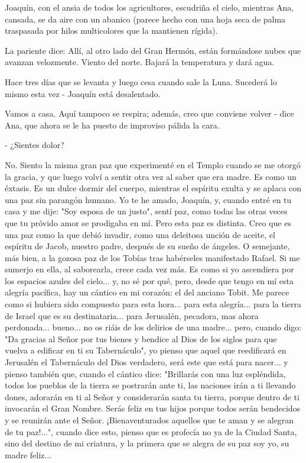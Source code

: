 \documentclass[12pt]{book} %
\begin{document}
Joaquín, con el ansia de todos los agricultores, escudriña el cielo, mientras Ana, cansada, se da aire con un abanico (parece hecho con una hoja seca de palma traspasada por hilos multicolores que la mantienen rígida). 

La pariente dice: Allí, al otro lado del Gran Hermón, están formándose nubes que avanzan velozmente. Viento del norte. Bajará la temperatura y dará agua. 

Hace tres días que se levanta y luego cesa cuando sale la Luna. Sucederá lo mismo esta vez - Joaquín está desalentado. 

Vamos a casa. Aquí tampoco se respira; además, creo que conviene volver - dice Ana, que ahora se le ha puesto de improviso pálida la cara. 

- ¿Sientes dolor? 

No. Siento la misma gran paz que experimenté en el Templo cuando se me otorgó la gracia, y que luego volví a sentir otra vez al saber que era madre. Es como un éxtasis. Es un dulce dormir del cuerpo, mientras el espíritu exulta y se aplaca con una paz sin parangón humano. Yo te he amado, Joaquín, y, cuando entré en tu casa y me dije: "Soy esposa de un justo", sentí paz, como todas las otras veces que tu próvido amor se prodigaba en mí. Pero esta paz es distinta. Creo que es una paz como la que debió invadir, como una deleitosa unción de aceite, el espíritu de Jacob, nuestro padre, después de su sueño de ángeles. O semejante, más bien, a la gozosa paz de los Tobías tras habérseles manifestado Rafael. Si me sumerjo en ella, al saborearla, crece cada vez más. Es como si yo ascendiera por los espacios azules del cielo... y, no sé por qué, pero, desde que tengo en mí esta alegría pacífica, hay un cántico en mi corazón: el del anciano Tobit. Me parece como si hubiera sido compuesto para esta hora... para esta alegría... para la tierra de Israel que es su destinataria... para Jerusalén, pecadora, mas ahora perdonada... bueno... no os riáis de los delirios de una madre... pero, cuando digo: "Da gracias al Señor por tus bienes y bendice al Dios de los siglos para que vuelva a edificar en ti su Tabernáculo", yo pienso que aquel que reedificará en Jerusalén el Tabernáculo del Dios verdadero, será este que está para nacer... y pienso también que, cuando el cántico dice: "Brillarás con una luz espléndida, todos los pueblos de la tierra se postrarán ante ti, las naciones irán a ti llevando dones, adorarán en ti al Señor y considerarán santa tu tierra, porque dentro de ti invocarán el Gran Nombre. Serás feliz en tus hijos porque todos serán bendecidos y se reunirán ante el Señor. ¡Bienaventurados aquellos que te aman y se alegran de tu paz!...", cuando dice esto, pienso que es profecía no ya de la Ciudad Santa, sino del destino de mi criatura, y la primera que se alegra de su paz soy yo, su madre feliz... 
\end{document}
